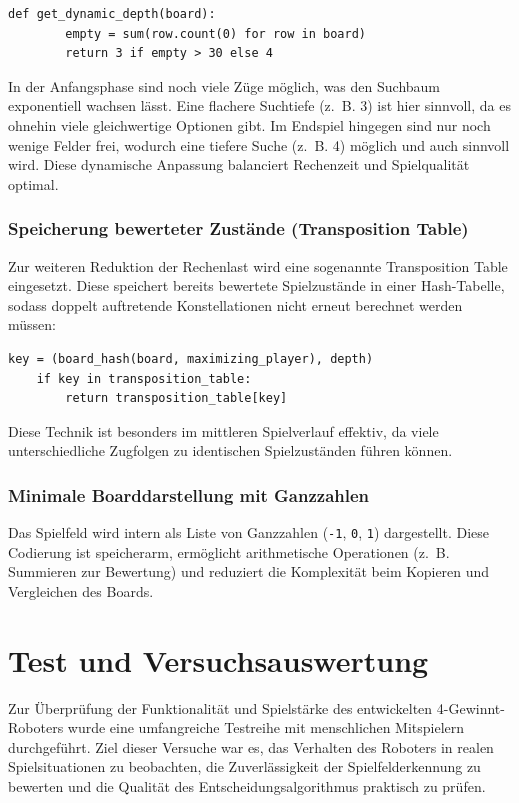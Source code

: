 \begin{lstlisting}[style=pythonstyle]
	def get_dynamic_depth(board):
		empty = sum(row.count(0) for row in board)
		return 3 if empty > 30 else 4
\end{lstlisting}

In der Anfangsphase sind noch viele Züge möglich, was den Suchbaum exponentiell wachsen lässt. Eine flachere Suchtiefe (z.~B. 3) ist hier sinnvoll, da es ohnehin viele gleichwertige Optionen gibt. Im Endspiel hingegen sind nur noch wenige Felder frei, wodurch eine tiefere Suche (z.~B. 4) möglich und auch sinnvoll wird. Diese dynamische Anpassung balanciert Rechenzeit und Spielqualität optimal.

\subsubsection{Speicherung bewerteter Zustände (Transposition Table)}

Zur weiteren Reduktion der Rechenlast wird eine sogenannte Transposition Table eingesetzt. Diese speichert bereits bewertete Spielzustände in einer Hash-Tabelle, sodass doppelt auftretende Konstellationen nicht erneut berechnet werden müssen:

\begin{lstlisting}[style=pythonstyle]
	key = (board_hash(board, maximizing_player), depth)
	if key in transposition_table:
		return transposition_table[key]
\end{lstlisting}

Diese Technik ist besonders im mittleren Spielverlauf effektiv, da viele unterschiedliche Zugfolgen zu identischen Spielzuständen führen können.

\subsubsection{Minimale Boarddarstellung mit Ganzzahlen}

Das Spielfeld wird intern als Liste von Ganzzahlen (\texttt{-1}, \texttt{0}, \texttt{1}) dargestellt. Diese Codierung ist speicherarm, ermöglicht arithmetische Operationen (z.~B. Summieren zur Bewertung) und reduziert die Komplexität beim Kopieren und Vergleichen des Boards.

\section{Test und Versuchsauswertung}

Zur Überprüfung der Funktionalität und Spielstärke des entwickelten 4-Gewinnt-Roboters wurde eine umfangreiche Testreihe mit menschlichen Mitspielern durchgeführt. Ziel dieser Versuche war es, das Verhalten des Roboters in realen Spielsituationen zu beobachten, die Zuverlässigkeit der Spielfelderkennung zu bewerten und die Qualität des Entscheidungsalgorithmus praktisch zu prüfen.

